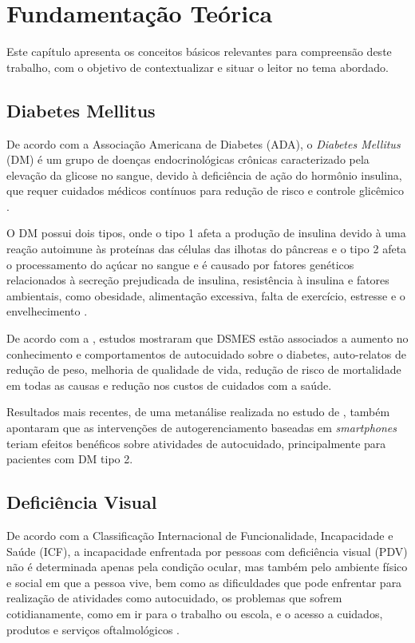 \chapter{Fundamentação Teórica}
\label{ch:fundament}

Este capítulo apresenta os conceitos básicos relevantes para compreensão deste trabalho,
com o objetivo de contextualizar e situar o leitor no tema abordado.

\section{Diabetes Mellitus}

De acordo com a Associação Americana de Diabetes (ADA), o \emph{Diabetes Mellitus} (DM) é um grupo de doenças endocrinológicas crônicas
caracterizado pela elevação da glicose no sangue, devido à deficiência de ação do hormônio insulina, que requer cuidados médicos
contínuos para redução de risco e controle glicêmico \cite{ADA2019}.

O DM possui dois tipos, onde o tipo 1 afeta a produção de insulina devido à uma reação autoimune às proteínas das células das
ilhotas do pâncreas e o tipo 2 afeta o processamento do açúcar no sangue e é causado por fatores genéticos relacionados à
secreção prejudicada de insulina, resistência à insulina e fatores ambientais, como obesidade, alimentação excessiva, falta de
exercício, estresse e o envelhecimento \cite{Ozougwu_2013}.

De acordo com a , estudos mostraram que DSMES estão associados a aumento no conhecimento e comportamentos de
autocuidado sobre o diabetes, auto-relatos de redução de peso, melhoria de qualidade de vida, redução de risco de mortalidade
em todas as causas e redução nos custos de cuidados com a saúde.

Resultados mais recentes, de uma metanálise realizada no estudo de , também apontaram que as intervenções
de autogerenciamento baseadas em \emph{smartphones} teriam efeitos benéficos sobre atividades de autocuidado, principalmente para
pacientes com DM tipo 2.

\section{Deficiência Visual}

De acordo com a Classificação Internacional de Funcionalidade, Incapacidade e Saúde (ICF),
a incapacidade enfrentada por pessoas com deficiência visual (PDV) não é determinada apenas
pela condição ocular, mas também pelo ambiente físico e social em que a pessoa vive, bem como
as dificuldades que pode enfrentar para realização de atividades como autocuidado, os problemas
que sofrem cotidianamente, como em ir para o trabalho ou escola, e o acesso a cuidados, produtos
e serviços oftalmológicos \cite{WHO2019}.

